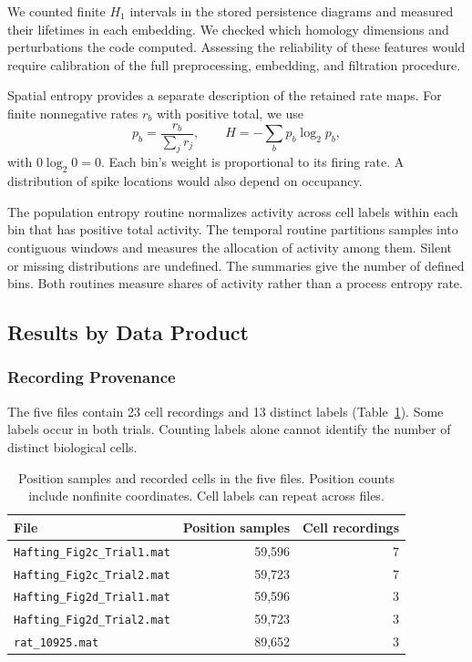 \documentclass[12pt,a4paper]{article}
\begin{document}
We counted finite $H_1$ intervals in the stored persistence diagrams and measured their lifetimes in each embedding. We checked which homology dimensions and perturbations the code computed. Assessing the reliability of these features would require calibration of the full preprocessing, embedding, and filtration procedure.

Spatial entropy provides a separate description of the retained rate maps. For finite nonnegative rates $r_b$ with positive total, we use
\begin{equation}\label{eq:spatial_entropy}
 p_b=\frac{r_b}{\sum_j r_j},\qquad
 H=-\sum_b p_b\log_2 p_b,
\end{equation}
with $0\log_2 0=0$. Each bin's weight is proportional to its firing rate. A distribution of spike locations would also depend on occupancy.

The population entropy routine normalizes activity across cell labels within each bin that has positive total activity. The temporal routine partitions samples into contiguous windows and measures the allocation of activity among them. Silent or missing distributions are undefined. The summaries give the number of defined bins. Both routines measure shares of activity rather than a process entropy rate.

\subsection{Results by Data Product}

\subsubsection{Recording Provenance}

The five files contain 23 cell recordings and 13 distinct labels (Table~\ref{tab:data_inventory}). Some labels occur in both trials. Counting labels alone cannot identify the number of distinct biological cells.

\begin{table}[H]
\centering
\caption{Position samples and recorded cells in the five files. Position counts include nonfinite coordinates. Cell labels can repeat across files.}
\label{tab:data_inventory}
\begin{tabular}{lrr}
\toprule
\textbf{File} & \textbf{Position samples} & \textbf{Cell recordings} \\
\midrule
\texttt{Hafting\_Fig2c\_Trial1.mat} & 59,596 & 7 \\
\texttt{Hafting\_Fig2c\_Trial2.mat} & 59,723 & 7 \\
\texttt{Hafting\_Fig2d\_Trial1.mat} & 59,596 & 3 \\
\texttt{Hafting\_Fig2d\_Trial2.mat} & 59,723 & 3 \\
\texttt{rat\_10925.mat} & 89,652 & 3 \\
\bottomrule
\end{tabular}
\end{table}
\end{document}
